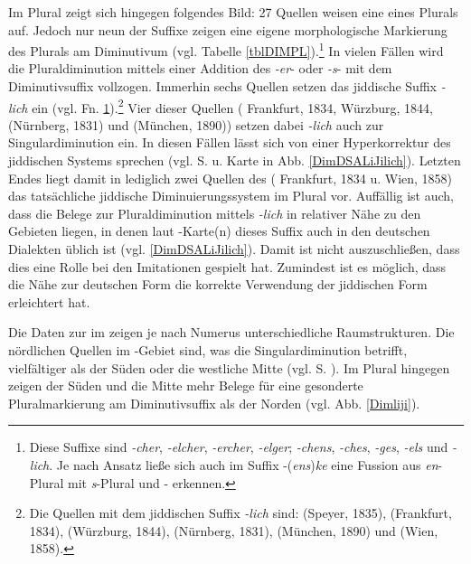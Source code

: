   
Im Plural zeigt sich hingegen folgendes Bild: 27 Quellen weisen eine  eines Plurals auf. Jedoch nur neun der Suffixe zeigen eine eigene morphologische Markierung des Plurals am Diminutivum (vgl. Tabelle \ref{tblDIMPL}).\footnote{\label{FNDIMPL}Diese Suffixe sind \textit{-cher}, \textit{-elcher}, \textit{-ercher}, \textit{-elger}; \textit{-chens}, \textit{-ches}, \textit{-ges}, \textit{-els} und \textit{-lich}. Je nach Ansatz ließe sich auch im Suffix -(\textit{ens})\textit{ke} eine Fussion aus \textit{en}-Plural mit \textit{s}-Plural und - erkennen.} In vielen Fällen wird die Pluraldiminution mittels einer Addition des  \textit{-er}- oder \textit{-s}- mit dem Diminutivsuffix vollzogen. Immerhin sechs Quellen setzen das jiddische Suffix \textit{-lich} ein (vgl. Fn. \ref{FNDIMPL}).\footnote{Die Quellen mit dem jiddischen Suffix \textit{-lich} sind:  (Speyer, 1835),  (Frankfurt, 1834),  (Würzburg, 1844),  (Nürnberg, 1831),  (München, 1890) und  (Wien, 1858).} Vier dieser Quellen ( Frankfurt, 1834,  Würzburg, 1844,  (Nürnberg, 1831) und  (München, 1890)) setzen dabei \textit{-lich} auch zur Singulardiminution ein. In diesen Fällen lässt sich von einer Hyperkorrektur des jiddischen Systems sprechen (vgl. S. \pageref{lichHyper} u. Karte in Abb. \ref{DimDSALiJilich}). Letzten Endes liegt damit in lediglich zwei Quellen des  ( Frankfurt, 1834 u.  Wien, 1858) das tatsächliche jiddische Diminuierungssystem im Plural vor. Auffällig ist auch, dass die Belege zur Pluraldiminution mittels \textit{-lich} in relativer Nähe zu den Gebieten liegen, in denen laut -Karte(n) dieses Suffix auch in den deutschen Dialekten üblich ist (vgl. \ref{DimDSALiJilich}). Damit ist nicht auszuschließen, dass dies eine Rolle bei den Imitationen gespielt hat. Zumindest ist es möglich, dass die Nähe zur deutschen Form die korrekte Verwendung der jiddischen Form erleichtert hat. 

Die Daten zur  im  zeigen je nach Numerus unterschiedliche Raumstrukturen. Die nördlichen Quellen im -Gebiet sind, was die Singulardiminution betrifft, vielfältiger als der Süden oder die westliche Mitte (vgl. S. \pageref{sgDIMimNordenmehr}). Im Plural hingegen zeigen der Süden und die Mitte mehr Belege für eine gesonderte Pluralmarkierung am Diminutivsuffix als der Norden (vgl. Abb. \ref{Dimliji}).\\

